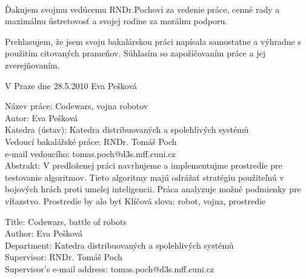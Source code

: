 \documentclass[12pt,notitlepage]{report}
\begin{document}
\normalsize %
\setcounter{page}{2} %

\ \vspace{10mm} 

\noindent Ďakujem svojmu vedúcemu RNDr.Pochovi za vedenie práce, cenné rady a maximálnu ústretovosť a svojej rodine za morálnu podporu. 

\vspace{\fill} %
\noindent Prehlasujem, že jsem svoju bakalárskou práci napísala samostatne a výhradne s použitím citovaných prameňov. Súhlasím so zapožičovaním práce a jej zverejňovaním.

\bigskip
\noindent V Praze dne 28.5.2010 \hspace{\fill}Eva Pešková\\ %


\tableofcontents

\newpage %

\noindent
Název práce: Codewars, vojna robotov\\
Autor: Eva Pešková\\
Katedra (ústav): Katedra distribuovaných a spolehlivých systémů\\
Vedoucí bakalářské práce: RNDr. Tomáš Poch\\
e-mail vedoucího: tomas.poch@d3s.mff.cuni.cz \\

\noindent Abstrakt: V predloženej práci navrhujeme a implementujme prostredie pre testovanie algoritmov. Tieto algoritmy majú odrážať stratégiu použiteľnú v bojových hrách proti umelej inteligencii. Práca analyzuje možné  podmienky pre víťazstvo. Prostredie by alo byť
\noindent Klíčová slova: robot, vojna, prostredie

\vspace{10mm}

\noindent
Title: Codewars, battle of robots\\
Author: Eva Pešková\\
Department: Katedra distribuovaných a spolehlivých systémů\\
Supervisor: RNDr. Tomáš Poch\\
Supervisor's e-mail address: tomas.poch@d3s.mff.cuni.cz \\
\end{document}
